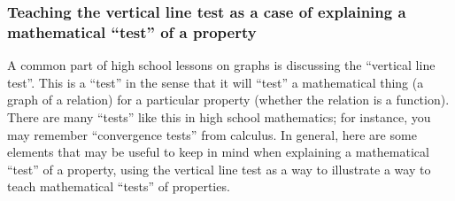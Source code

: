 \documentclass[11pt]{article}
\theoremstyle{definition}
\begin{document}
\subsubsection{Teaching the vertical line test as a case of explaining a mathematical ``test'' of a property}
\label{s: mathematical test of a property}

A common part of high school lessons on graphs is discussing the ``vertical line test''. This is a ``test'' in the sense that it will ``test'' a mathematical thing (a graph of a relation) for a particular property (whether the relation is a function). There are many ``tests'' like this in high school mathematics; for instance, you may remember ``convergence tests'' from calculus. In general, here are some elements that may be useful to keep in mind when explaining a mathematical ``test'' of a property, using the vertical line test as a way to illustrate a way to teach mathematical ``tests'' of properties. 
\end{document}
